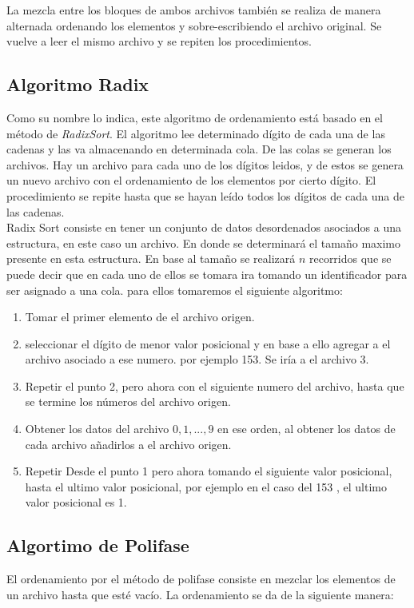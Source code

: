 \documentclass{article}
\begin{document}
		La mezcla entre los bloques de ambos archivos también se realiza de manera alternada ordenando los elementos y sobre-escribiendo el archivo original. Se vuelve a leer el mismo archivo
		y se repiten los procedimientos.
		
		\subsection{Algoritmo Radix}
		Como su nombre lo indica, este algoritmo de ordenamiento está basado en el método de \textit{RadixSort}. El algoritmo lee determinado dígito de cada una de las cadenas y las
		va almacenando en determinada cola. De las colas se generan los archivos. Hay un archivo para cada uno de los dígitos leidos, y de estos se genera un nuevo archivo con el ordenamiento
		de los elementos por cierto dígito. El procedimiento se repite hasta que se hayan leído todos los dígitos de cada una de las cadenas.\\
		
		Radix Sort consiste en tener un conjunto de datos desordenados asociados a una estructura, en este caso un archivo. En donde se determinará el tamaño maximo presente en esta estructura.
		En base al tamaño se realizará $n$ recorridos que se puede decir que en cada uno de ellos se tomara ira tomando un identificador para ser asignado a una cola.
		para ellos tomaremos el siguiente algoritmo:
		
		\begin{enumerate}
			\item Tomar el primer elemento de el archivo origen.
			\item seleccionar el dígito de menor valor posicional  y en base a ello agregar a el archivo asociado a ese numero. por ejemplo 153. Se iría a  el archivo 3.
			\item Repetir el punto 2, pero ahora con el siguiente numero del archivo, hasta que se termine los números del archivo origen.
			\item  Obtener los datos del archivo  $0,1,...,9$ en ese orden, al obtener los datos de cada archivo añadirlos a el archivo origen.
			\item Repetir Desde el punto 1 pero ahora tomando el siguiente valor posicional, hasta el ultimo valor posicional,  por ejemplo en el caso del 153 , el ultimo valor posicional es 1.
		\end{enumerate}
		
		\subsection{Algortimo de Polifase}
		El ordenamiento por el método de polifase consiste en mezclar los elementos de un archivo hasta que esté vacío.
		La ordenamiento se da de la siguiente manera:
		
\end{document}

